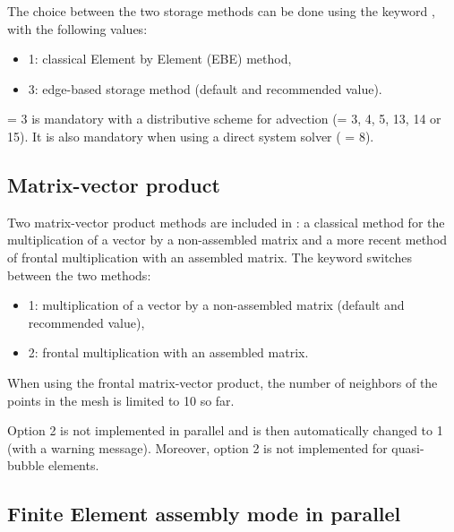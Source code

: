 The choice between the two storage methods can be done using the keyword
, with the following values:

\begin{itemize}
\item 1: classical Element by Element (EBE) method,

\item 3: edge-based storage method (default and recommended value).
\end{itemize}

 = 3 is mandatory with a distributive scheme
for advection (= 3, 4, 5, 13, 14 or 15).
It is also mandatory when using a direct system solver ( = 8).


\subsection{Matrix-vector product}

Two matrix-vector product methods are included in :
a classical method for the multiplication of a vector by a non-assembled matrix
and a more recent method of frontal multiplication with an assembled matrix.
The keyword  switches between the two methods:

\begin{itemize}
\item 1: multiplication of a vector by a non-assembled matrix
(default and recommended value),

\item 2: frontal multiplication with an assembled matrix.
\end{itemize}

When using the frontal matrix-vector product,
the number of neighbors of the points in the mesh is limited to 10 so far.

Option 2 is not implemented in parallel and is then automatically changed to 1
(with a warning message).
Moreover, option 2 is not implemented for quasi-bubble elements.


\subsection{Finite Element assembly mode in parallel}

